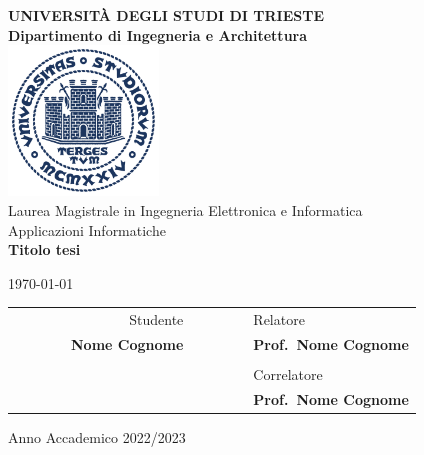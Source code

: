 \begin{titlepage}
    \begin{center}
        {\LARGE {\bfseries UNIVERSITÀ DEGLI STUDI DI TRIESTE \\}}
        \vspace{.5cm}
        {\Large {\bfseries Dipartimento di Ingegneria e Architettura \\}}
        \vspace{1cm}
        \includegraphics[width=4cm,height=4cm]{img/units_sigillo_pantone-534}\\[1.5cm]

        {\LARGE
            Laurea Magistrale in Ingegneria Elettronica e Informatica \\
        }
        {\LARGE
                Applicazioni Informatiche \\
        }
        \vspace{1cm}
        {\LARGE
            {\bfseries Titolo tesi}
        }
        \vspace{1cm}

        {\large \today \\
        }

        \vfill
        \begin{table}[h]\label{tab:table}
            {\large
                    \begin{tabular}{c c c c r c c | c c l}
                        & & & & Studente & & & & & Relatore \\
                        & & & & \bfseries Nome Cognome & & & & & \bfseries Prof.\ Nome Cognome \\
                        & & & & & & & & & \\
                        & & & & & & & & & Correlatore \\
                        & & & & & & & & & \bfseries Prof.\ Nome Cognome \\
                    \end{tabular}
                }
        \end{table}
        Anno Accademico 2022/2023
    \end{center}
\end{titlepage}
